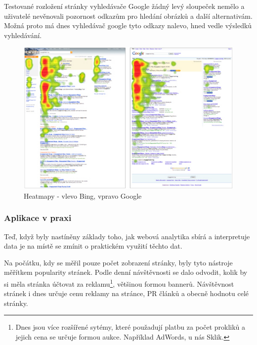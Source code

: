 \documentclass[bc,female,java,dept456]{diploma}						%
\begin{document}
Testované rozložení stránky vyhledávače Google žádný levý sloupeček nemělo a uživatelé nevěnovali pozornost odkazům pro hledání obrázků a další alternativám. Možná proto má dnes vyhledávač google tyto odkazy nalevo, hned vedle výsledků vyhledávání.

\begin{figure}[hp]
	\centering
	\includegraphics[width=14cm]{img/google-bing-heatmap.pdf}
	\caption{Heatmapy - vlevo Bing, vpravo Google}
	\label{img:heatmap-bing-google}
\end{figure}






\subsubsection{Aplikace v praxi}

Teď, když byly nastíněny základy toho, jak webová analytika sbírá a interpretuje data je na místě se zmínit o praktickém využití těchto dat.


Na počátku, kdy se měřil pouze počet zobrazení stránky, byly tyto nástroje měřítkem popularity stránek. Podle denní návštěvnosti se dalo odvodit, kolik by si měla stránka účtovat za reklamu\footnote{Dnes jsou více rozšířené sytémy, které použadují platbu za počet prokliků a jejich cena se určuje formou aukce. Například AdWords, u nás Sklik.}, většinou formou bannerů. Návštěvnost stránek i dnes určuje cenu reklamy na stránce, PR článků a obecně hodnotu celé stránky.
\end{document}
